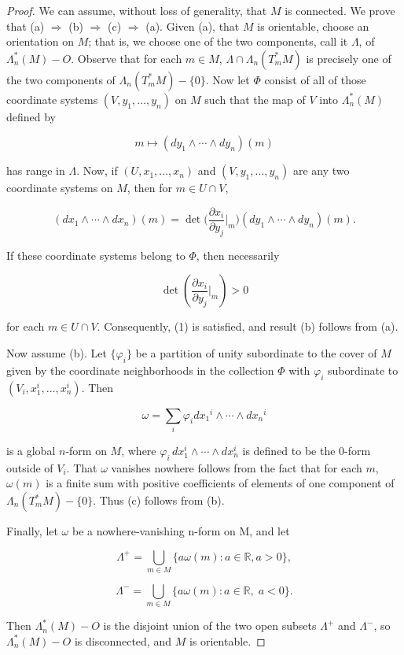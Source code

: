 \begin{proof}
We can assume, without loss of generality, that $M$ is connected. We prove that (a) $\Rightarrow$ (b) $\Rightarrow$ (c) $\Rightarrow$ (a). Given (a), that $M$ is orientable, choose an orientation on $M$; that is, we choose one of the two components, call it $\Lambda$, of $\Lambda_n^*(M) - O$. Observe that for each $m \in M$, $\Lambda \cap \Lambda_n(T_{m}^{*} M)$ is precisely one of the two components of $\Lambda_n(T_{m}^{*} M) - \{0\}$. Now let $\Phi$ consist of all of those coordinate systems $(V, y_1, \ldots, y_n)$ on $M$ such that the map of $V$ into $\Lambda_n^*(M)$ defined by

\begin{equation}
\tag{2}\label{eq:4.2:2}
m\mapsto(d y_{1}\land\cdots\land d y_{n})(m)
\end{equation}

has range in $\Lambda$. Now, if $(U, x_1, \ldots, x_n)$ and $(V, y_1, \ldots, y_n)$ are any two coordinate systems on $M$, then for $m \in U \cap V$,

\begin{equation}
\tag{3}\label{eq:4.2:3}
(d x_{1}\wedge\dotsm\wedge d x_{n})(m)=\det\biggl(\frac{\partial x_{i}}{\partial y_{j}}\bigg|_{m}\biggr)(d y_{1}\wedge\dotsm\wedge d y_{n})(m).
\end{equation}

If these coordinate systems belong to $\Phi$, then necessarily

\[
\det\left(\frac{\partial x_{i}}{\partial y_{j}}\bigg|_{m}\right)>0
\]

for each $m \in U \cap V$. Consequently, (1) is satisfied, and result (b) follows from (a).

Now assume (b). Let $\{\varphi_i\}$ be a partition of unity subordinate to the cover of $M$ given by the coordinate neighborhoods in the collection $\Phi$ with $\varphi_i$ subordinate to $(V_i, x_1^i, \ldots, x_n^i)$. Then

\begin{equation}
\tag{4}\label{eq:4.2:4}
\omega=\sum_{i}\varphi_{i}d x_{1}{}^{i}\wedge\cdots\wedge d x_{n}{}^{i}
\end{equation}

is a global $n$-form on $M$, where $\varphi_i \, dx_1^i \wedge \cdots \wedge dx_n^i$ is defined to be the $0$-form outside of $V_i$. That $\omega$ vanishes nowhere follows from the fact that for each $m$, $\omega(m)$ is a finite sum with positive coefficients of elements of one component of $\Lambda_n(T_{m}^{*} M) - \{0\}$. Thus (c) follows from (b).

Finally, let  $ \omega $ be a nowhere-vanishing n-form on M, and let

\[
\Lambda^{+}=\bigcup_{m\in M}\{a\omega(m)\colon a\in\mathbb{R},a>0\},
\]

\[
\Lambda^{-}=\bigcup_{m\in M}\{a\omega(m)\colon a\in\mathbb{R},\;a<0\}.
\]

Then  $ \Lambda_n^*(M) - O $ is the disjoint union of the two open subsets  $ \Lambda^+ $ and  $ \Lambda^- $, so  $ \Lambda_n^*(M) - O $ is disconnected, and  $ M $ is orientable.

\end{proof}

